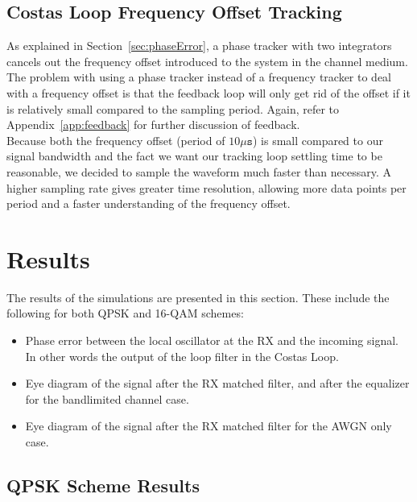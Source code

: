 \documentclass[]{article}
\begin{document}
\subsection{Costas Loop Frequency Offset Tracking}
As explained in Section~\ref{sec:phaseError}, a phase tracker with two integrators cancels out the frequency offset introduced to the system in the channel medium. The problem with using a phase tracker instead of a frequency tracker to deal with a frequency offset is that the feedback loop will only get rid of the offset if it is relatively small compared to the sampling period.  Again, refer to Appendix~\ref{app:feedback} for further discussion of feedback.\\

Because both the frequency offset (period of $10 \mathtt{\mu s}$) is small compared to our signal bandwidth and the fact we want our tracking loop settling time to be reasonable, we decided to sample the waveform much faster than necessary.  A higher sampling rate gives greater time resolution, allowing more data points per period and a faster understanding of the frequency offset.

\newpage
\section{Results}
\label{sec:results}
The results of the simulations are presented in this section. These include the following for both QPSK and 16-QAM schemes:
\begin{itemize}
\item Phase error between the local oscillator at the RX and the incoming signal. In other words the output of the loop filter in the Costas Loop.
\item Eye diagram of the signal after the RX matched filter, and after the equalizer for the bandlimited channel case.
\item Eye diagram of the signal after the RX matched filter for the AWGN only case.
\end{itemize}


\subsection{QPSK Scheme Results}
\end{document}
